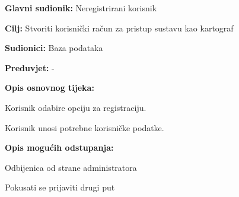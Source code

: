 				\noindent {}
				\begin{packed_item}
					
					\item \textbf{Glavni sudionik: }Neregistrirani korisnik
					\item  \textbf{Cilj:} Stvoriti korisnički račun za pristup sustavu kao kartograf
					\item  \textbf{Sudionici:} Baza podataka
					\item  \textbf{Preduvjet:} -
					\item  \textbf{Opis osnovnog tijeka:}
					
					\item[] \begin{packed_enum}
						
						\item Korisnik odabire opciju za registraciju.
						\item Korisnik unosi potrebne korisničke podatke.
					\end{packed_enum}
					
					\item  \textbf{Opis mogućih odstupanja:}
					
					\item[] \begin{packed_item}
						
						\item[2.a] Odbijenica od strane administratora
						\item[] \begin{packed_enum}
							
							\item Pokusati se prijaviti drugi put
							
						\end{packed_enum}
						
					\end{packed_item}
				\end{packed_item}
				\noindent {}

